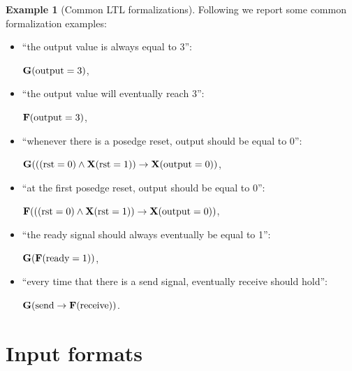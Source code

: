 \documentclass{article}
\theoremstyle{definition}
\newtheorem{example}{Example}[section]
\begin{document}
\begin{example}[Common LTL formalizations]
Following we report some common formalization examples:
\begin{itemize}  
\item ``the output value is always equal to 3'':
  
  $\text{\textbf{G}}(\text{output} = 3)$,
\item ``the output value will eventually reach 3'':

  $\text{\textbf{F}}(\text{output} = 3)$,
\item ``whenever there is a posedge reset, output should be equal to 0'':
  
  $\text{\textbf{G}}(((\text{rst} = 0) \wedge \text{\textbf{X}}(\text{rst} = 1)) \rightarrow \text{\textbf{X}}(\text{output} = 0))$,

\item ``at the first posedge reset, output should be equal to 0'':
  
  $\text{\textbf{F}}(((\text{rst} = 0) \wedge \text{\textbf{X}}(\text{rst} = 1)) \rightarrow \text{\textbf{X}}(\text{output} = 0))$,

\item ``the ready signal should always eventually be equal to 1'':
  
  $\text{\textbf{G}}(\text{\textbf{F}}(\text{ready} = 1))$,
  
\item ``every time that there is a send signal, eventually receive should hold'':
  
  $\text{\textbf{G}}(\text{send} \rightarrow \text{\textbf{F}}(\text{receive}))$.
  
\end{itemize}  
  
\end{example}





\section{Input formats}
\label{sec:input_formats}
\end{document}
